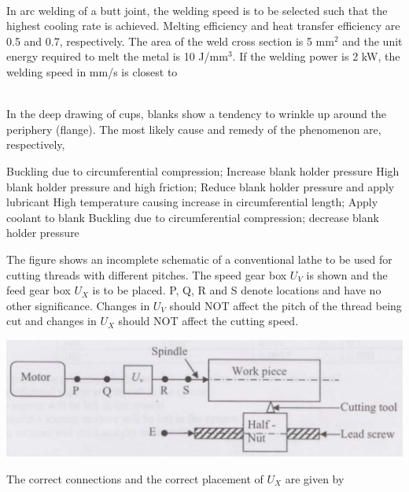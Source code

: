 \documentclass[addpoints,11pt]{exam}
\begin{document}
\begin{questions}
    \begin{oneparchoices}
    \end{oneparchoices}\\

    \question In arc welding of a butt joint, the welding speed is to be selected such that the highest cooling rate is achieved. Melting efficiency and heat transfer efficiency are 0.5 and 0.7, respectively. The area of the weld cross section is 5 mm$^2$ and the unit energy required to melt the metal is 10 J/mm$^3$. If the welding power is 2 kW, the welding speed in mm/s is closest to\\

    \begin{oneparchoices}
    \end{oneparchoices}\\

    \question In the deep drawing of cups, blanks show a tendency to wrinkle up around the periphery (flange). The most likely cause and remedy of the phenomenon are, respectively,\\

    \begin{choices}
        \choice Buckling due to circumferential compression; Increase blank holder pressure
        \choice High blank holder pressure and high friction; Reduce blank holder pressure and apply lubricant
        \choice High temperature causing increase in circumferential length; Apply coolant to blank
        \choice Buckling due to circumferential compression; decrease blank holder pressure
    \end{choices}

    \question The figure shows an incomplete schematic of a conventional lathe to be used for cutting threads with different pitches. The speed gear box $U_V$ is shown and the feed gear box $U_X$ is to be placed. P, Q, R and S denote locations and have no other significance. Changes in $U_V$ should NOT affect the pitch of the thread being cut and changes in $U_X$ should NOT affect the cutting speed.
    
    \begin{center}
        \includegraphics[scale=0.3]{q69}
    \end{center}
    The correct connections and the correct placement of $U_X$ are given by


\end{questions}
\end{document}
